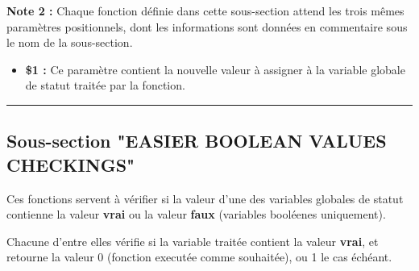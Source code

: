 \documentclass[a4paper,10pt]{article}
\begin{document}
\begin{justify}
    \textbf{Note 2 :} Chaque fonction définie dans cette sous-section attend les trois mêmes paramètres positionnels, dont les informations sont données en commentaire sous le nom de la sous-section.
\end{justify}

\begin{itemize}
    \item
    {
        \begin{justify}
            \textbf{\$1 :} Ce paramètre contient la nouvelle valeur à assigner à la variable globale de statut traitée par la fonction.
        \end{justify}


    }
\end{itemize}




\color{green}\par\noindent\rule{\textwidth}{0.4pt}\color{white}

\color{green}
\subsection{Sous-section "EASIER BOOLEAN VALUES CHECKINGS"}\color{white}

\begin{justify}
    Ces fonctions servent à vérifier si la valeur d'une des variables globales de statut contienne la valeur \textbf{vrai} ou la valeur \textbf{faux} (variables booléenes uniquement).
\end{justify}

\begin{justify}
    Chacune d'entre elles vérifie si la variable traitée contient la valeur \textbf{vrai}, et retourne la valeur 0 (fonction executée comme souhaitée), ou 1 le cas échéant.
\end{justify}
\end{document}
